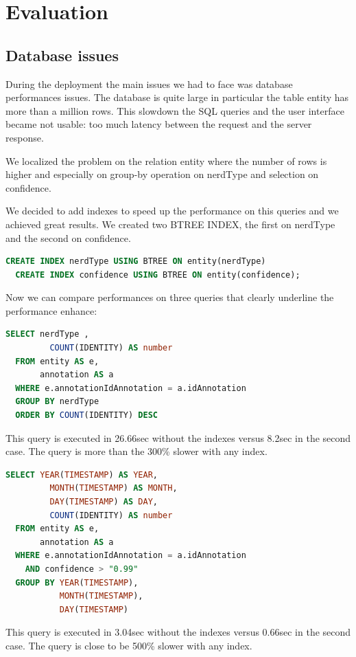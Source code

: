 \documentclass[a4paper,13pt]{report}
\begin{document}
\chapter{Evaluation} %
\label{cha:evaluation}
\section{Database issues}
During the deployment the main issues we had to face was database performances issues.
The database is quite large in particular the table entity has more than a million rows. This slowdown the SQL queries and the user interface became not usable: too much latency between the request and the server response.

We localized the problem on the relation entity where the number of rows is higher and especially on group-by operation on nerdType and selection on confidence.


We decided to add indexes to speed up the performance on this queries and we achieved great results.
We created two BTREE INDEX, the first on nerdType and the second on confidence.
\vspace{0.4cm}
        \begin{lstlisting}[language=SQL]
  CREATE INDEX nerdType USING BTREE ON entity(nerdType)
  CREATE INDEX confidence USING BTREE ON entity(confidence); 
        \end{lstlisting}
\vspace{0.9cm}
Now we can compare performances on three queries that clearly underline the performance enhance:
\vspace{0.3cm}
        \begin{lstlisting}[language=SQL]
  SELECT nerdType ,
         COUNT(IDENTITY) AS number
  FROM entity AS e,
       annotation AS a
  WHERE e.annotationIdAnnotation = a.idAnnotation
  GROUP BY nerdType
  ORDER BY COUNT(IDENTITY) DESC 
        \end{lstlisting}
\vspace{0.3cm}
This query is executed in 26.66sec without the indexes versus 8.2sec in the second case. The query is more than the 300\% slower with any index.

\vspace{0.9cm}
        \begin{lstlisting}[language=SQL]
   SELECT YEAR(TIMESTAMP) AS YEAR,
         MONTH(TIMESTAMP) AS MONTH,
         DAY(TIMESTAMP) AS DAY,
         COUNT(IDENTITY) AS number
  FROM entity AS e,
       annotation AS a
  WHERE e.annotationIdAnnotation = a.idAnnotation
    AND confidence > "0.99"
  GROUP BY YEAR(TIMESTAMP),
           MONTH(TIMESTAMP),
           DAY(TIMESTAMP) 
        \end{lstlisting}
\vspace{0.3cm}
This query is executed in 3.04sec without the indexes versus 0.66sec in the second case. The query is close to be 500\% slower with any index.
\end{document}
